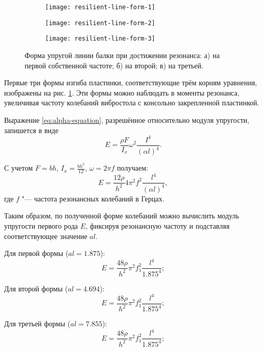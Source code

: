 \begin{figure}[!ht]
    \centering
    \begin{subfigure}[t]{0.5\textwidth}
        \centering
        \texttt{[image: resilient-line-form-1]}
        \caption{}
    \end{subfigure}
    \begin{subfigure}[t]{0.5\textwidth}
        \centering
        \texttt{[image: resilient-line-form-2]}
        \caption{}
    \end{subfigure}
    \begin{subfigure}[t]{0.5\textwidth}
        \centering
        \texttt{[image: resilient-line-form-3]}
        \caption{}
    \end{subfigure}
    \caption{Форма упругой линии балки при достижении резонанса: а) на первой собственной частоте; б) на второй; в) на третьей.}
    \label{fig:resilient-line-form}
\end{figure}

Первые три формы изгиба пластинки, соответствующие трём корням уравнения, изображены на рис. \ref{fig:resilient-line-form}.
Эти формы можно наблюдать в моменты резонанса, увеличивая частоту колебаний вибростола с консольно закрепленной пластинкой.

Выражение \eqref{eq:alpha-equation}, разрешённое относительно модуля упругости, запишется в виде
\[
    E = \frac{\rho F}{I_x} \omega^2 \frac{I^4}{(\alpha l)^4}.
\]

С учетом $F = b h$, $I_x = \frac{b h^3}{12}$, $\omega = 2 \pi f$ получаем:
\[
    E = \frac{12 \rho}{h^2} 4 \pi^2 f^2 \frac{l^4}{(\alpha l)^4},
\]
где $f$ "--- частота резонансных колебаний в Герцах.

Таким образом, по полученной форме колебаний можно вычислить модуль упругости первого рода $E$, фиксируя резонансную частоту и подставляя соответствующее значение $al$.

Для первой формы ($al = 1.875$):
\begin{equation}\label{eq:resilience-module-1}
    E = \frac{48 \rho}{h^2} \pi^2 f_1^2 \frac{l^4}{1.875^4};
\end{equation}

Для второй формы ($al = 4.694$):
\begin{equation}\label{eq:resilience-module-2}
    E = \frac{48 \rho}{h^2} \pi^2 f_1^2 \frac{l^4}{1.875^4};
\end{equation}

Для третьей формы ($al = 7.855$):
\begin{equation}\label{eq:resilience-module-3}
    E = \frac{48 \rho}{h^2} \pi^2 f_1^2 \frac{l^4}{1.875^4};
\end{equation}

